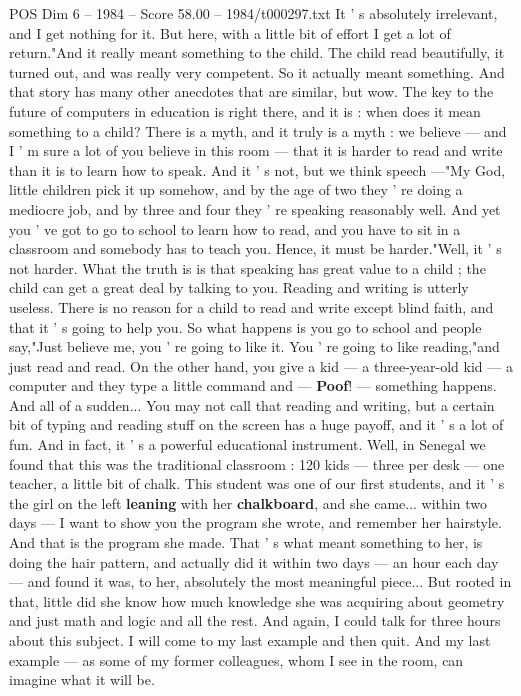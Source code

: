 \begin{textsample}{POS Dim 6 – 1984 – Score 58.00 – 1984/t000297.txt}
It ' s absolutely irrelevant, and I get nothing for it.
But here, with a little bit of effort I get a lot of return."And it really meant something to the child.
The child read beautifully, it turned out, and was really very competent.
So it actually meant something.
And that story has many other anecdotes that are similar, but wow.
The key to the future of computers in education is right there, and it is : when does it mean something to a child?
There is a myth, and it truly is a myth : we believe — and I ' m sure a lot of you believe in this room — that it is harder to read and write than it is to learn how to speak.
And it ' s not, but we think speech —"My God, little children pick it up somehow, and by the age of two they ' re doing a mediocre job, and by three and four they ' re speaking reasonably well.
And yet you ' ve got to go to school to learn how to read, and you have to sit in a classroom and somebody has to teach you.
Hence, it must be harder."Well, it ' s not harder.
What the truth is is that speaking has great value to a child ; the child can get a great deal by talking to you.
Reading and writing is utterly useless.
There is no reason for a child to read and write except blind faith, and that it ' s going to help you.
So what happens is you go to school and people say,"Just believe me, you ' re going to like it.
You ' re going to like reading,"and just read and read.
On the other hand, you give a kid — a three-year-old kid — a computer and they type a little command and — \textbf{Poof}! — something happens.
And all of a sudden...
You may not call that reading and writing, but a certain bit of typing and reading stuff on the screen has a huge payoff, and it ' s a lot of fun.
And in fact, it ' s a powerful educational instrument.
Well, in Senegal we found that this was the traditional classroom : 120 kids — three per desk — one teacher, a little bit of chalk.
This student was one of our first students, and it ' s the girl on the left \textbf{leaning} with her \textbf{chalkboard}, and she came... within two days — I want to show you the program she wrote, and remember her hairstyle.
And that is the program she made.
That ' s what meant something to her, is doing the hair pattern, and actually did it within two days — an hour each day — and found it was, to her, absolutely the most meaningful piece...
But rooted in that, little did she know how much knowledge she was acquiring about geometry and just math and logic and all the rest.
And again, I could talk for three hours about this subject.
I will come to my last example and then quit.
And my last example — as some of my former colleagues, whom I see in the room, can imagine what it will be.

\end{textsample}
